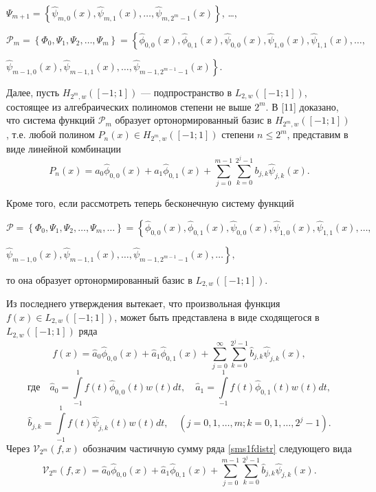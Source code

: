 \documentclass[12pt]{book}
\begin{document}
$\Psi_{m+1} =  \left\{\hat{\psi}_{m,0}(x), \hat{\psi}_{m,1}(x), \ldots, \hat{\psi}_{m, 2^{m}-1}(x)  \right\}$, \ldots,

$\mathcal{P}_m = \left\{\Phi_{0}, \Psi_1, \Psi_2, \ldots, \Psi_m \right\} =
\left\{\hat{\phi}_{0,0}(x), \hat{\phi}_{0,1}(x), \hat{\psi}_{0,0}(x), \hat{\psi}_{1,0}(x), \hat{\psi}_{1,1}(x), \ldots, \right.$

$\left. \hat{\psi}_{m-1,0}(x), \hat{\psi}_{m-1,1}(x), \ldots, \hat{\psi}_{m-1, 2^{m-1}-1}(x) \right\}$.

Далее, пусть $H_{2^{m}, w}([-1; 1])$ --- подпространство в $L_{2, w}([-1; 1])$, состоящее из алгебраических полиномов степени не выше $2^{m}$. В [11]
доказано, что система функций $\mathcal{P}_m$ образует ортонормированный базис в $H_{2^{m}, w}([-1; 1])$, т.е. любой полином $P_{n}(x) \in H_{2^{m}, w}([-1; 1])$ степени $n \leq 2^{m}$,
представим в виде линейной комбинации
\begin{equation}
\label{sms1polydistr}
P_{n}(x) = a_{0}\hat{\phi}_{0,0}(x) + a_{1}\hat{\phi}_{0,1}(x) + \sum\limits_{j=0}^{m-1} \sum\limits_{k=0}^{2^j-1} b_{j,k}\hat{\psi}_{j,k}(x).
\end{equation}

\noindent Кроме того, если рассмотреть теперь бесконечную систему функций

$\mathcal{P} = \left\{\Phi_{0}, \Psi_1, \Psi_2, \ldots, \Psi_m, \ldots \right\} =
\left\{\hat{\phi}_{0,0}(x), \hat{\phi}_{0,1}(x), \hat{\psi}_{0,0}(x), \hat{\psi}_{1,0}(x), \hat{\psi}_{1,1}(x), \ldots,\right.$

$\left. \hat{\psi}_{m-1,0}(x), \hat{\psi}_{m-1,1}(x), \ldots, \hat{\psi}_{m-1, 2^{m-1}-1}(x), \ldots \right\},$

\noindent то она образует ортонормированный базис в $L_{2, w}([-1; 1])$.


Из  последнего утверждения вытекает, что произвольная функция $f(x) \in L_{2, w}([-1; 1])$, может быть представлена в виде сходящегося в $L_{2, w}([-1; 1])$ ряда
\begin{equation}
\label{sms1fdistr}
f(x) = \hat{a}_{0}\hat{\phi}_{0,0}(x) + \hat{a}_{1}\hat{\phi}_{0,1}(x) + \sum\limits_{j=0}^{\infty} \sum\limits_{k=0}^{2^j-1} \hat{b}_{j,k}\hat{\psi}_{j,k}(x),
\end{equation}
\begin{equation*}
\label{sms1fcoeffA}
\text{где}\quad \hat{a}_{0} = \int\limits_{-1}^{1} f(t)\hat{\phi}_{0,0}(t)w(t)dt, \quad \hat{a}_{1} = \int\limits_{-1}^{1} f(t)\hat{\phi}_{0,1}(t)w(t)dt,
\end{equation*}
\begin{equation*}
\label{sms1fcoeffB}
\hat{b}_{j,k} = \int\limits_{-1}^{1} f(t)\hat{\psi}_{j,k}(t)w(t)dt, \quad (j=0,1, \ldots, m; k = 0, 1, \ldots, 2^j-1).
\end{equation*}
Через $\mathcal{V}_{2^m}(f,x)$ обозначим частичную сумму ряда \eqref{sms1fdistr} следующего вида
\begin{equation}
\label{sms1wavepartsum}
\mathcal{V}_{2^m}(f,x) = \hat{a}_{0}\hat{\phi}_{0,0}(x) + \hat{a}_{1}\hat{\phi}_{0,1}(x) + \sum\limits_{j=0}^{m-1} \sum\limits_{k=0}^{2^j-1} \hat{b}_{j,k}\hat{\psi}_{j,k}(x).
\end{equation}
\end{document}
